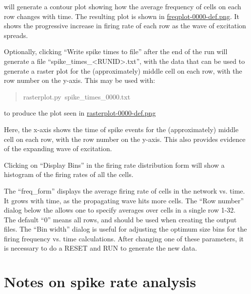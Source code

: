 \documentclass[10pt,a4paper,english]{article}
\begin{document}
will generate a contour plot showing how the average frequency of cells
on each row changes with time.  The resulting plot is shown in
\href{figures/freqplot-0000-def.png}{freqplot-0000-def.png}. It shows the progressive increase in
firing rate of each row as the wave of excitation spreads.

Optionally, clicking ``Write spike times to file'' after the end of the run
will generate a file ``spike{\_}times{\_}{\textless}RUNID{\textgreater}.txt'', with the data that can be
used to generate a raster plot for the (approximately) middle cell on each
row, with the row number on the y-axis.  This may be used with:
\begin{quote}{\ttfamily \raggedright \noindent
rasterplot.py~spike{\_}times{\_}0000.txt
}\end{quote}

to produce the plot seen in \href{figures/rasterplot-0000-def.png}{rasterplot-0000-def.png}

Here, the x-axis shows the time of spike events for the (approximately)
middle cell on each row, with the row number on the y-axis.  This also
provides evidence of the expanding wave of excitation.

Clicking on ``Display Bins'' in the firing rate distribution form will
show a histogram of the firing rates of all the cells.

The ``freq{\_}form'' displays the average firing rate of cells in the network
vs. time.  It grows with time, as the propagating wave hits more cells.
The ``Row number'' dialog below the allows one to specify averages over cells
in a single row 1-32.  The default ``0'' means all rows, and should be used
when creating the output files.  The ``Bin width'' dialog is useful for
adjusting the optimum size bins for the firing frequency vs. time
calculations.  After changing one of these parameters, it is necessary
to do a RESET and RUN to generate the new data.



\hypertarget{notes-on-spike-rate-analysis}{}
\section*{Notes on spike rate analysis}
\label{notes-on-spike-rate-analysis}
\end{document}
